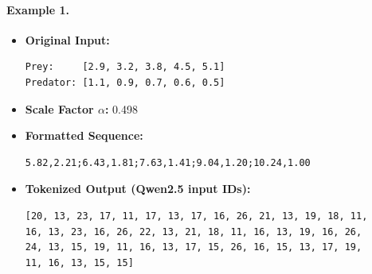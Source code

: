\documentclass[a4paper,12pt]{article}
\begin{document}
\paragraph{Example 1.}
\begin{itemize}
  \item \textbf{Original Input:}
  \begin{verbatim}
Prey:     [2.9, 3.2, 3.8, 4.5, 5.1]
Predator: [1.1, 0.9, 0.7, 0.6, 0.5]
  \end{verbatim}

  \vspace{-0.7cm}

  \item \textbf{Scale Factor $\alpha$:} 0.498


  \item \textbf{Formatted Sequence:}
  \begin{verbatim}
5.82,2.21;6.43,1.81;7.63,1.41;9.04,1.20;10.24,1.00
  \end{verbatim}

  \vspace{-0.7cm}

  \item \textbf{Tokenized Output (Qwen2.5 input IDs):}
  \begin{verbatim}
[20, 13, 23, 17, 11, 17, 13, 17, 16, 26, 21, 13, 19, 18, 11,
16, 13, 23, 16, 26, 22, 13, 21, 18, 11, 16, 13, 19, 16, 26,
24, 13, 15, 19, 11, 16, 13, 17, 15, 26, 16, 15, 13, 17, 19,
11, 16, 13, 15, 15]
  \end{verbatim}
\end{itemize}

\vspace{-1cm}
\end{document}
